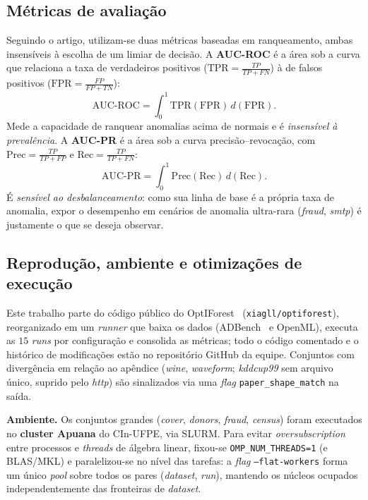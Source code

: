 \documentclass[conference]{IEEEtran}
\begin{document}
\subsection{M\'etricas de avalia\c{c}\~ao}
Seguindo o artigo, utilizam-se duas m\'etricas baseadas em ranqueamento, ambas
insens\'iveis \`a escolha de um limiar de decis\~ao. A \textbf{AUC-ROC} \'e a \'area
sob a curva que relaciona a taxa de verdadeiros positivos
($\mathrm{TPR}=\frac{TP}{TP+FN}$) \`a de falsos positivos
($\mathrm{FPR}=\frac{FP}{FP+TN}$):
\begin{equation}
  \mathrm{AUC\text{-}ROC} = \int_{0}^{1} \mathrm{TPR}(\mathrm{FPR})\, d(\mathrm{FPR}).
  \label{eq:auroc}
\end{equation}
Mede a capacidade de ranquear anomalias acima de normais e \'e \emph{insens\'ivel \`a
preval\^encia}. A \textbf{AUC-PR} \'e a \'area sob a curva precis\~ao--revoca\c{c}\~ao,
com $\mathrm{Prec}=\frac{TP}{TP+FP}$ e $\mathrm{Rec}=\frac{TP}{TP+FN}$:
\begin{equation}
  \mathrm{AUC\text{-}PR} = \int_{0}^{1} \mathrm{Prec}(\mathrm{Rec})\, d(\mathrm{Rec}).
  \label{eq:aupr}
\end{equation}
\'E \emph{sens\'ivel ao desbalanceamento}: como sua linha de base \'e a pr\'opria
taxa de anomalia, expor o desempenho em cen\'arios de anomalia ultra-rara
(\emph{fraud}, \emph{smtp}) \'e justamente o que se deseja observar.

\subsection{Reprodu\c{c}\~ao, ambiente e otimiza\c{c}\~oes de execu\c{c}\~ao}
Este trabalho parte do c\'odigo p\'ublico do OptIForest~\cite{optiforest}
(\texttt{xiagll/optiforest}), reorganizado em um \emph{runner} que baixa os dados
(ADBench~\cite{adbench} e OpenML), executa as $15$ \emph{runs} por configura\c{c}\~ao e
consolida as m\'etricas; todo o c\'odigo comentado e o hist\'orico de modifica\c{c}\~oes
est\~ao no reposit\'orio GitHub da equipe. Conjuntos com diverg\^encia em rela\c{c}\~ao ao
ap\^endice (\emph{wine}, \emph{waveform}; \emph{kddcup99} sem arquivo \'unico, suprido
pelo \emph{http}) s\~ao sinalizados via uma \emph{flag} \texttt{paper\_shape\_match} na
sa\'ida.

\textbf{Ambiente.} Os conjuntos grandes (\emph{cover}, \emph{donors}, \emph{fraud},
\emph{census}) foram executados no \textbf{cluster Apuana} do CIn-UFPE, via SLURM.
Para evitar \emph{oversubscription} entre processos e \emph{threads} de \'algebra
linear, fixou-se \texttt{OMP\_NUM\_THREADS=1} (e BLAS/MKL) e paralelizou-se no n\'ivel
das tarefas: a \emph{flag} \texttt{--flat-workers} forma um \'unico \emph{pool} sobre
todos os pares (\emph{dataset}, \emph{run}), mantendo os n\'ucleos ocupados
independentemente das fronteiras de \emph{dataset}.
\end{document}
